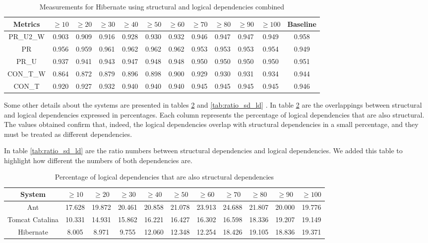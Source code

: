 \documentclass[runningheads]{comsis2}
\begin{document}
\begin{table}[!h]
\setlength\tabcolsep{3.5pt}
\caption{Measurements for Hibernate using structural and logical dependencies combined}
\label{tab:measurementscombined:hibernate}
\centering
\begin{tabular}{|c|cccccccccc|c|}
\hline
Metrics &	$\geq10$	&	$\geq20$		&	$\geq30$		&	$\geq40$		&	$\geq50$		&	$\geq60$		&	$\geq70$		&	$\geq80$		&	$\geq90$		&	$\geq100$		&	Baseline \\
\hline

PR\_U2\_W	&	0.903	&	0.909	&	0.916	&	0.928	&	0.930	&	0.932	&	0.946	&	0.947	&	0.947	&	0.949	&	0.958	\\
PR	&	0.956	&	0.959	&	0.961	&	0.962	&	0.962	&	0.962	&	0.953	&	0.953	&	0.953	&	0.954	&	0.949	\\
PR\_U	&	0.937	&	0.941	&	0.943	&	0.947	&	0.948	&	0.948	&	0.950	&	0.950	&	0.950	&	0.950	&	0.951	\\
CON\_T\_W	&	0.864	&	0.872	&	0.879	&	0.896	&	0.898	&	0.900	&	0.929	&	0.930	&	0.931	&	0.934	&	0.944	\\
CON\_T	&	0.920	&	0.927	&	0.932	&	0.940	&	0.940	&	0.940	&	0.945	&	0.945	&	0.945	&	0.945	&	0.946	\\

\hline
\end{tabular}
\end{table}

Some other details about the systems are presented in tables \ref{tab:overlap} and \ref{tab:ratio_sd_ld} . In table \ref{tab:overlap} are the overlappings between structural and logical dependencies expressed in percentages. Each column represents the percentage of logical dependencies that are also structural. 
The values obtained confirm that, indeed, the logical dependencies overlap with structural dependencies in a small percentage, and they must be treated as different dependencies.

In table \ref{tab:ratio_sd_ld} are the ratio numbers between structural dependencies and logical dependencies. We added this table to highlight how different the numbers of both dependencies are.


\begin{table}[!h]
\setlength\tabcolsep{3pt}
\caption{Percentage of logical dependencies that are also structural dependencies}
\label{tab:overlap}
\centering
\begin{tabular}{|c|cccccccccc|}
\hline
System &	$\geq10$	&	$\geq20$		&	$\geq30$		&	$\geq40$		&	$\geq50$		&	$\geq60$		&	$\geq70$		&	$\geq80$		&	$\geq90$		&	$\geq100$ \\
\hline
Ant	&	17.628	&	19.872	&	20.461	&	20.858	&	21.078	&	23.913	&	24.688	&	21.807	&	20.000	&	19.776	\\
Tomcat Catalina  	&	10.331	&	14.931	&	15.862	&	16.221	&	16.427	&	16.302	&	16.598	&	18.336	&	19.207	&	19.149	\\
Hibernate	&	8.005	&	8.971	&	9.755	&	12.060	&	12.348	&	12.254	&	18.426	&	19.105	&	18.836	&	19.371	\\
\hline
\end{tabular}
\end{table}
\end{document}
